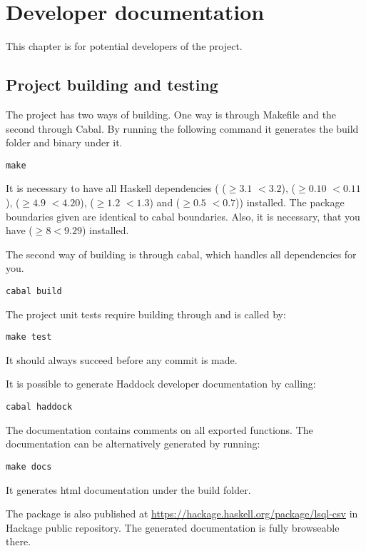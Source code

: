 \chapter{Developer documentation}
This chapter is for potential developers of the project.

\section{Project building and testing}
The project has two ways of building. One way is through Makefile and the second through Cabal. 
By running the following command it generates the build folder and  binary under it.
\begin{verbatim}
make
\end{verbatim}
 
It is necessary to have all Haskell dependencies ( ($\geq 3.1$ $<3.2$),  ($\geq 0.10$ $<0.11$), 
 ($\geq 4.9$ $<4.20$),  ($\geq 1.2$ $<1.3$) and  ($\geq 0.5$ $<0.7$)) installed.
The package boundaries given are identical to cabal boundaries. Also, it is necessary, that you have  ($\geq 8 <9.29$) installed.

The second way of building is through cabal, which handles all dependencies for you.

\begin{verbatim}
cabal build
\end{verbatim}


The project unit tests require building through  and is called by:
\begin{verbatim}
make test
\end{verbatim}
It should always succeed before any commit is made.

It is possible to generate Haddock developer documentation by calling:
\begin{verbatim}
cabal haddock
\end{verbatim}

The documentation contains comments on all exported functions. The documentation can be alternatively generated
by running:

\begin{verbatim}
make docs
\end{verbatim}
It generates html documentation under the build folder.

The package is also published at \url{https://hackage.haskell.org/package/lsql-csv} in Hackage public repository. 
The generated documentation is fully browseable there.

